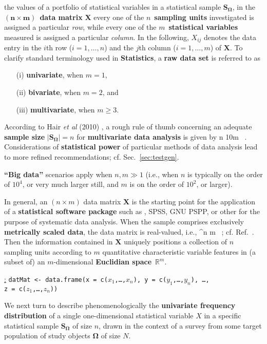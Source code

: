 the values of a portfolio of statistical variables in a 
statistical sample $\boldsymbol{S_{\Omega}}$, in the 
$\boldsymbol{(n \times m)}$~\textbf{data matrix} 
$\boldsymbol{X}$ every one of the $n$~\textbf{sampling units} 
investigated is assigned a particular \textit{row}, while every one 
of the $m$~\textbf{statistical variables} measured is assigned a 
particular \textit{column}. In the following, $X_{ij}$ denotes the 
data entry in the $i$th row ($i=1,\ldots,n$) and the $j$th column 
($i=1,\ldots,m$) of $\boldsymbol{X}$. To clarify standard 
terminology used in \textbf{Statistics}, a \textbf{raw data set} is 
referred to as
%
\begin{itemize}
\item[(i)] \textbf{univariate}, when $m=1$,
\item[(ii)] \textbf{bivariate}, when $m=2$, and
\item[(iii)] \textbf{multivariate}, when $m \geq 3$.
\end{itemize}
%
According to Hair \textit{et al} (2010) 
, a rough rule of thumb concerning an 
adequate \textbf{sample size} $|\boldsymbol{S_{\Omega}}|=n$ for 
\textbf{multivariate data analysis} is given 
by
%
\be
{}
n \geq 10m \ .
\ee
%
Considerations of \textbf{statistical power} of particular methods
of data analysis lead to more refined recommendations; cf. 
Sec.~\ref{sec:testgen}.

\medskip
\noindent
\textbf{``Big data''} scenarios apply when $n, m 
\gg 1$ (i.e., when $n$ is typically on the order of $10^{4}$, or
very much larger still, and $m$ is on the order of $10^{2}$, or
larger).

\medskip
\noindent
In general, an $(n \times m)$ data matrix $\boldsymbol{X}$ is the 
starting point for the application of a \textbf{statistical
software package} such as \R{}, SPSS, GNU PSPP, or other for the
purpose of systematic data analysis. When the sample comprises
exclusively \textbf{metrically scaled data}, the data matrix is
real-valued, i.e.,
%
\be
{}
 \in {}^{n \times m} \ ;
\ee
%
cf. Ref.~. Then the information contained in 
$\boldsymbol{X}$ uniquely positions a collection of $n$ sampling 
units according to $m$ quantitative characteristic variable 
features in (a subset of) an $m$-dimensional \textbf{Euclidian
space}~$\mathbb{R}^{m}$.

\medskip
\noindent
\underline{\R:} \texttt{datMat <- data.frame(x = c($x_{1}$,\ldots,$x_{n}$),
y = c($y_{1}$,\ldots,$y_{n}$), \ldots, \\
z = c($z_{1}$,\ldots,$z_{n}$))} 

\vspace{5mm}
\noindent
We next turn to describe phenomenologically the \textbf{univariate 
frequency distribution} of a single one-dimensional statistical 
variable $X$ in a specific statistical sample 
$\boldsymbol{S_{\Omega}}$ of size $n$,  drawn in the context of a 
survey from some target population of study objects 
$\boldsymbol{\Omega}$ of size $N$.

